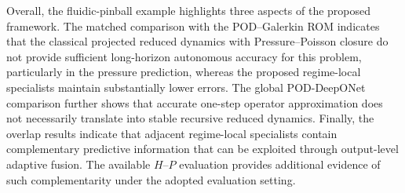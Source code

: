 Overall, the fluidic-pinball example highlights three aspects of the proposed
framework. The matched comparison with the POD--Galerkin ROM indicates that
the classical projected reduced dynamics with Pressure--Poisson closure do
not provide sufficient long-horizon autonomous accuracy for this problem,
particularly in the pressure prediction, whereas the proposed regime-local
specialists maintain substantially lower errors. The global POD-DeepONet
comparison further shows that accurate one-step operator approximation does
not necessarily translate into stable recursive reduced dynamics. Finally,
the overlap results indicate that adjacent regime-local specialists contain
complementary predictive information that can be exploited through
output-level adaptive fusion. The available $H$--$P$ evaluation provides
additional evidence of such complementarity under the adopted evaluation
setting.

